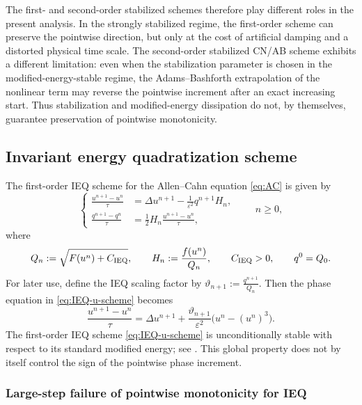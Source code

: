 \documentclass[final, 3p, times]{elsarticle}%
\newcommand{\eps}{\varepsilon}
\begin{document}
The first- and second-order stabilized schemes therefore play different
roles in the present analysis. In the strongly stabilized regime, the
first-order scheme can preserve the pointwise direction, but only at the
cost of artificial damping and a distorted physical time scale. The
second-order stabilized CN/AB scheme exhibits a different limitation:
even when the stabilization parameter is chosen in the
modified-energy-stable regime, the Adams--Bashforth extrapolation of the
nonlinear term may reverse the pointwise increment after an exact
increasing start. Thus stabilization and modified-energy dissipation do
not, by themselves, guarantee preservation of pointwise monotonicity.

\subsection{Invariant energy quadratization scheme}
\label{sec:IEQ}

The first-order IEQ scheme for the Allen--Cahn equation \eqref{eq:AC} is given by
\begin{equation}
\left\{
\begin{aligned}
    \frac{u^{n+1}-u^n}{\tau}
    &=\Delta u^{n+1}-\frac{1}{\eps^2}q^{n+1}H_n,\\
    \frac{q^{n+1}-q^n}{\tau}
    &=\frac12H_n\frac{u^{n+1}-u^n}{\tau},
\end{aligned}
\right.
\qquad n\ge0,
\label{eq:IEQ-u-scheme}
\end{equation}
where
\begin{equation}
    Q_n:=\sqrt{F(u^n)+C_{\rm IEQ}},
    \qquad
    H_n:=\frac{f(u^n)}{Q_n},
    \qquad
    C_{\rm IEQ}>0,
    \qquad
    q^0=Q_0.
    \label{eq:IEQ-QH}
\end{equation}
For later use, define the IEQ scaling factor by
$\vartheta_{n+1}:=\frac{q^{n+1}}{Q_n}.$
Then the phase equation in \eqref{eq:IEQ-u-scheme} becomes
\begin{equation}
    \frac{u^{n+1}-u^n}{\tau}
    =\Delta u^{n+1}
    +\frac{\vartheta_{n+1}}{\eps^2}
    \bigl(u^n-(u^n)^3\bigr).
    \label{eq:IEQ-scaled-form}
\end{equation}
The first-order IEQ scheme \eqref{eq:IEQ-u-scheme} is unconditionally stable
with respect to its standard modified energy; see \cite{yang2020convergence}.
This global property does not by itself control the sign of the pointwise phase
increment.

\subsubsection{Large-step failure of pointwise monotonicity for IEQ}
\end{document}
